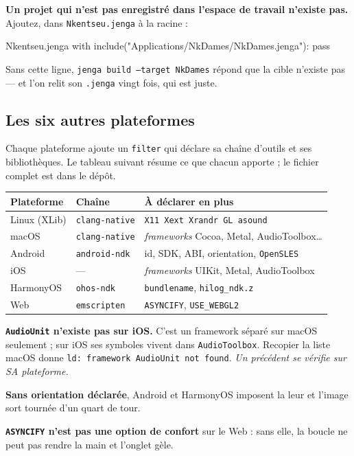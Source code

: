 \begin{nkpiege}
\textbf{Un projet qui n'est pas enregistré dans l'espace de travail n'existe
pas.} Ajoutez, dans \texttt{Nkentseu.jenga} à la racine :

\begin{nkcode}{Nkentseu.jenga}
with include("Applications/NkDames/NkDames.jenga"):
    pass
\end{nkcode}

Sans cette ligne, \texttt{jenga build --target NkDames} répond que la cible
n'existe pas --- et l'on relit son \texttt{.jenga} vingt fois, qui est juste.
\end{nkpiege}

\subsection{Les six autres plateformes}

Chaque plateforme ajoute un \texttt{filter} qui déclare sa chaîne d'outils et
ses bibliothèques. Le tableau suivant résume ce que chacun apporte ; le fichier
complet est dans le dépôt.

\begin{center}
\begin{tabular}{@{}lll@{}}
\toprule
\textbf{Plateforme} & \textbf{Chaîne} & \textbf{À déclarer en plus} \\
\midrule
Linux (XLib) & \texttt{clang-native} & \texttt{X11 Xext Xrandr GL asound} \\
macOS & \texttt{clang-native} & \emph{frameworks} Cocoa, Metal, AudioToolbox\dots \\
Android & \texttt{android-ndk} & id, SDK, ABI, orientation, \texttt{OpenSLES} \\
iOS & --- & \emph{frameworks} UIKit, Metal, AudioToolbox \\
HarmonyOS & \texttt{ohos-ndk} & \texttt{bundlename}, \texttt{hilog\_ndk.z} \\
Web & \texttt{emscripten} & \texttt{ASYNCIFY}, \texttt{USE\_WEBGL2} \\
\bottomrule
\end{tabular}
\end{center}

\begin{nkpiege}
\textbf{\texttt{AudioUnit} n'existe pas sur iOS.} C'est un framework séparé sur
macOS seulement ; sur iOS ses symboles vivent dans \texttt{AudioToolbox}.
Recopier la liste macOS donne \texttt{ld: framework AudioUnit not found}.
\emph{Un précédent se vérifie sur SA plateforme.}

\textbf{Sans orientation déclarée}, Android et HarmonyOS imposent la leur et
l'image sort tournée d'un quart de tour.

\textbf{\texttt{ASYNCIFY} n'est pas une option de confort} sur le Web : sans
elle, la boucle ne peut pas rendre la main et l'onglet gèle.
\end{nkpiege}

